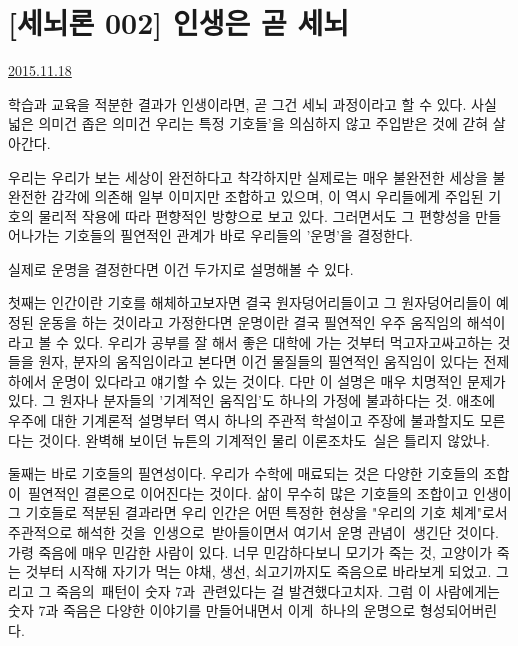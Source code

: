\section{[세뇌론 002] 인생은 곧 세뇌}
\href{https://www.kockoc.com/Apoc/499298}{2015.11.18}

\vspace{5mm}

학습과 교육을 적분한 결과가 인생이라면, 곧 그건 세뇌 과정이라고 할 수 있다.
사실 넓은 의미건 좁은 의미건 우리는 특정 기호들'을 의심하지 않고 주입받은 것에 갇혀 살아간다.
\vspace{5mm}

우리는 우리가 보는 세상이 완전하다고 착각하지만
실제로는 매우 불완전한 세상을 불완전한 감각에 의존해 일부 이미지만 조합하고 있으며,
이 역시 우리들에게 주입된 기호의 물리적 작용에 따라 편향적인 방향으로 보고 있다.
그러면서도 그 편향성을 만들어나가는 기호들의 필연적인 관계가 바로 우리들의 '운명'을 결정한다.
\vspace{5mm}

실제로 운명을 결정한다면 이건 두가지로 설명해볼 수 있다.
\vspace{5mm}

첫째는 인간이란 기호를 해체하고보자면 결국 원자덩어리들이고
그 원자덩어리들이 예정된 운동을 하는 것이라고 가정한다면 운명이란 결국 필연적인 우주 움직임의 해석이라고 볼 수 있다.
우리가 공부를 잘 해서 좋은 대학에 가는 것부터 먹고자고싸고하는 것들을 원자, 분자의 움직임이라고 본다면
이건 물질들의 필연적인 움직임이 있다는 전제 하에서 운명이 있다라고 얘기할 수 있는 것이다.
다만 이 설명은 매우 치명적인 문제가 있다. 그 원자나 분자들의 '기계적인 움직임'도 하나의 가정에 불과하다는 것.
애초에 우주에 대한 기계론적 설명부터 역시 하나의 주관적 학설이고 주장에 불과할지도 모른다는 것이다.
완벽해 보이던 뉴튼의 기계적인 물리 이론조차도 실은 틀리지 않았나.
\vspace{5mm}

둘째는 바로 기호들의 필연성이다. 우리가 수학에 매료되는 것은 다양한 기호들의 조합이 필연적인 결론으로 이어진다는 것이다.
삶이 무수히 많은 기호들의 조합이고 인생이 그 기호들로 적분된 결과라면
우리 인간은 어떤 특정한 현상을 "우리의 기호 체계"로서 주관적으로 해석한 것을 인생으로 받아들이면서 여기서 운명 관념이 생긴단 것이다.
가령 죽음에 매우 민감한 사람이 있다.
너무 민감하다보니 모기가 죽는 것, 고양이가 죽는 것부터 시작해 자기가 먹는 야채, 생선, 쇠고기까지도 죽음으로 바라보게 되었고.
그리고 그 죽음의 패턴이 숫자 7과 관련있다는 걸 발견했다고치자.
그럼 이 사람에게는 숫자 7과 죽음은 다양한 이야기를 만들어내면서 이게 하나의 운명으로 형성되어버린다.
\vspace{5mm}

